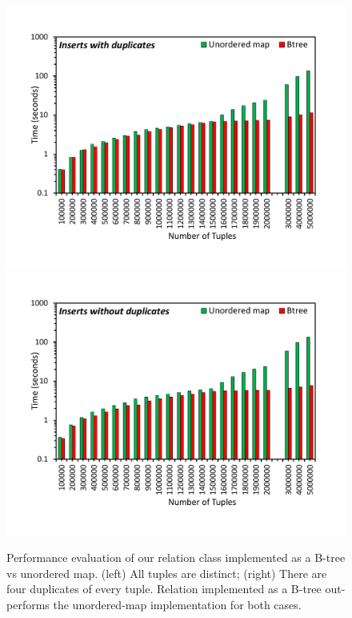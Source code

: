 
\begin{figure}[t]
	{\includegraphics[width=.50\textwidth,  trim={0cm 0cm 0cm 0cm, 
			clip}]{results/inserts_with_duplicates.pdf}}\hfill%
	{\includegraphics[width=.50\textwidth,  trim={0cm 0cm 0cm 0cm,
			clip}]{results/inserts_with_no_duplicates.pdf}}\hfill%
	\centering
	\caption{Performance evaluation of our relation class implemented as a B-tree vs unordered map. (left) All tuples are distinct; (right) There are four duplicates of every tuple. Relation implemented as a B-tree out-performs the unordered-map implementation for both cases.}
	\label{fig:tuple_inserts}
\end{figure}


